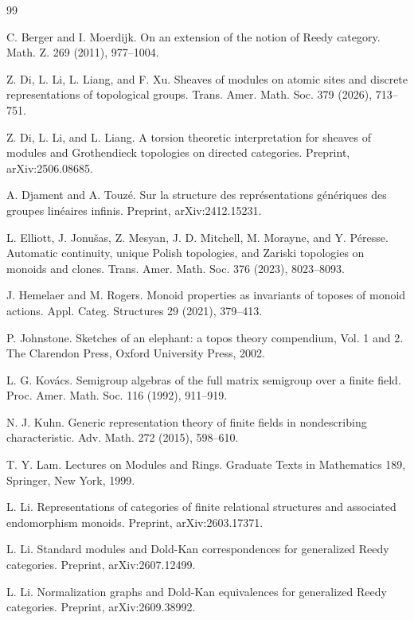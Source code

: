 \documentclass[10pt, reqno]{amsart}
\theoremstyle{plain}
\numberwithin{equation}{section}
\theoremstyle{definition}
\begin{document}
\begin{thebibliography}{99}

 C. Berger and I. Moerdijk. On an extension of the notion of Reedy category. Math. Z. 269 (2011), 977--1004.

 Z. Di, L. Li, L. Liang, and F. Xu. Sheaves of modules on atomic sites and discrete representations of topological groups. Trans. Amer. Math. Soc. 379 (2026), 713--751.

 Z. Di, L. Li, and L. Liang. A torsion theoretic interpretation for sheaves of modules and Grothendieck topologies on directed categories. Preprint, arXiv:2506.08685.

 A. Djament and A. Touz\'e. Sur la structure des repr\'esentations g\'en\'eriques des groupes lin\'eaires infinis. Preprint, arXiv:2412.15231.

 L. Elliott, J. Jonu\v{s}as, Z. Mesyan, J. D. Mitchell, M. Morayne, and Y. P\'{e}resse. Automatic continuity, unique Polish topologies, and Zariski topologies on monoids and clones. Trans. Amer. Math. Soc. 376 (2023), 8023--8093.
    
 J. Hemelaer and M. Rogers. Monoid properties as invariants of toposes of monoid actions. Appl. Categ. Structures 29 (2021), 379--413.

 P. Johnstone. Sketches of an elephant: a topos theory compendium, Vol. 1 and 2. The Clarendon Press, Oxford University Press, 2002.

 L. G. Kov\'{a}cs. Semigroup algebras of the full matrix semigroup over a finite field. Proc. Amer. Math. Soc. 116 (1992), 911--919.

 N. J. Kuhn. Generic representation theory of finite fields in nondescribing characteristic. Adv. Math. 272 (2015), 598--610.

 T. Y. Lam. Lectures on Modules and Rings. Graduate Texts in Mathematics 189, Springer, New York, 1999.

 L. Li. Representations of categories of finite relational structures and associated endomorphism monoids. Preprint, arXiv:2603.17371.

 L. Li. Standard modules and Dold-Kan correspondences for generalized Reedy categories. Preprint, arXiv:2607.12499.

 L. Li. Normalization graphs and Dold-Kan equivalences for generalized Reedy categories. Preprint, arXiv:2609.38992.


\end{thebibliography}
\end{document}
